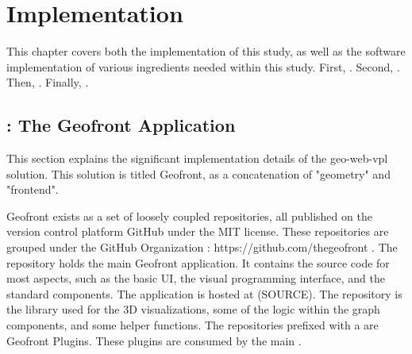 \chapter{Implementation}%
\label{chap:implementation}

This chapter covers both the implementation of this study, as well as the software implementation of various ingredients needed within this study. 
First, .
Second, .
Then, .
Finally, .

\section{\mySubRQOneTitle: The Geofront Application}
\label{sec:implementation:representation}

This section explains the significant implementation details of the geo-web-vpl solution.
This solution is titled Geofront, as a concatenation of "geometry" and "frontend".

Geofront exists as a set of loosely coupled repositories, all published on the version control platform GitHub under the MIT license. These repositories are grouped under the GitHub Organization  : https://github.com/thegeofront .
The  repository holds the main Geofront application. It contains the source code for most aspects, such as the basic UI, the visual programming interface, and the standard components. The application is hosted at (SOURCE).
The  repository is the library used for the 3D visualizations, some of the logic within the graph components, and some helper functions.
The repositories prefixed with a  are Geofront Plugins. These plugins are consumed by the main .

